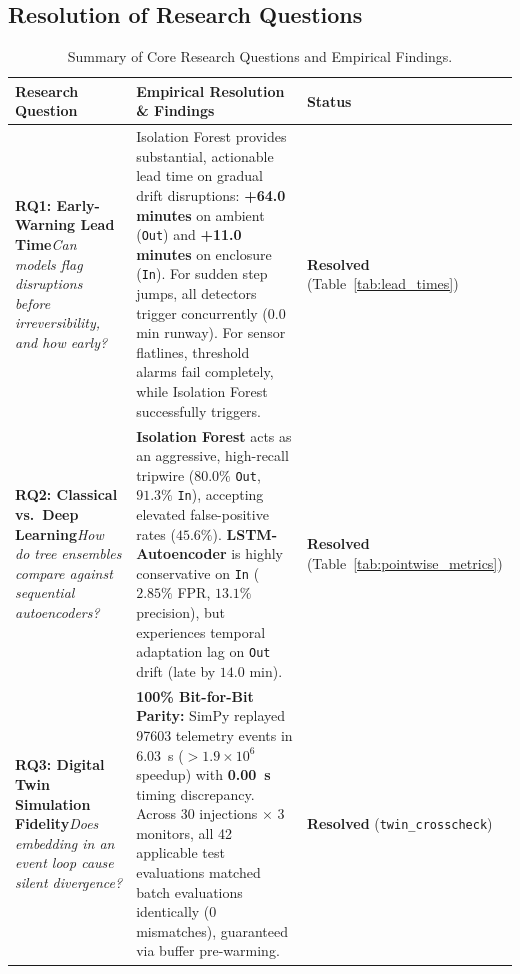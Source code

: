 \documentclass[11pt,a4paper,oneside]{article}
\begin{document}
\subsection{Resolution of Research Questions}
\begin{table}[H]
\centering
\small
\renewcommand{\arraystretch}{1.25}
\begin{tabularx}{\textwidth}{L{3.2cm} Y C{2.2cm}}
\toprule
{}
\textbf{Research Question} & \textbf{Empirical Resolution \& Findings} & \textbf{Status} \\
\midrule
\textbf{RQ1: Early-Warning Lead Time}\newline\textit{Can models flag disruptions before irreversibility, and how early?} &
Isolation Forest provides substantial, actionable lead time on gradual drift disruptions: \textbf{+64.0 minutes} on ambient (\texttt{Out}) and \textbf{+11.0 minutes} on enclosure (\texttt{In}). For sudden step jumps, all detectors trigger concurrently ($0.0$ min runway). For sensor flatlines, threshold alarms fail completely, while Isolation Forest successfully triggers. &
\textbf{\textcolor{EmeraldGreen}{Resolved}} (Table~\ref{tab:lead_times}) \\
\addlinespace
\textbf{RQ2: Classical vs.\ Deep Learning}\newline\textit{How do tree ensembles compare against sequential autoencoders?} &
\textbf{Isolation Forest} acts as an aggressive, high-recall tripwire ($80.0\%$ \texttt{Out}, $91.3\%$ \texttt{In}), accepting elevated false-positive rates ($45.6\%$). \textbf{LSTM-Autoencoder} is highly conservative on \texttt{In} ($2.85\%$ FPR, $13.1\%$ precision), but experiences temporal adaptation lag on \texttt{Out} drift (late by $14.0$ min). &
\textbf{\textcolor{EmeraldGreen}{Resolved}} (Table~\ref{tab:pointwise_metrics}) \\
\addlinespace
\textbf{RQ3: Digital Twin Simulation Fidelity}\newline\textit{Does embedding in an event loop cause silent divergence?} &
\textbf{100\% Bit-for-Bit Parity:} SimPy replayed \num{97603} telemetry events in \SI{6.03}{\second} ($>1.9\times 10^6$ speedup) with \textbf{\SI{0.00}{\second}} timing discrepancy. Across 30 injections $\times$ 3 monitors, all 42 applicable test evaluations matched batch evaluations identically (0 mismatches), guaranteed via buffer pre-warming. &
\textbf{\textcolor{EmeraldGreen}{Resolved}} (\texttt{twin\_crosscheck}) \\
\bottomrule
\end{tabularx}
\caption{Summary of Core Research Questions and Empirical Findings.}
\label{tab:rq_summary}
\end{table}
\end{document}
